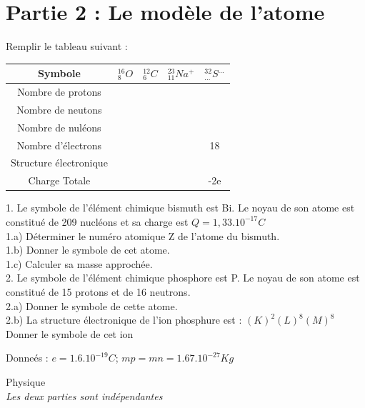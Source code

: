\documentclass[12pt]{article}
\begin{document}
\section*{Partie 2 : Le modèle de l'atome}
Remplir le tableau suivant :

    \begin{center}
    \begin{tabular} { | c | c | c |c|c| }
    \hline\hline
        Symbole         & $^{16}_8O$ &$^{12}_6C$ & $^{23}_{11}Na^{+}$ & $^{32}_{...}S^{...}$\\\hline
        Nombre de protons & & & & \\\hline
        Nombre de neutons & & & & \\\hline
        Nombre de nuléons & & & & \\\hline
        Nombre d’électrons& & & & 18\\\hline
        Structure électronique & & & & \\\hline
        Charge Totale & & & &-2e \\\hline
    \hline
    \end{tabular}
    \end{center}
    1. Le symbole de l’élément chimique bismuth est Bi. Le noyau de son atome est
constitué de 209 nucléons et sa charge est $Q = 1,33.10^{-17}C$
\\1.a) Déterminer le numéro atomique Z de l’atome du bismuth.
\\1.b) Donner le symbole de cet atome.
\\1.c) Calculer sa masse approchée.
\\2. Le symbole de l’élément chimique phosphore est P. Le noyau de
son atome est constitué de 15 protons et de 16 neutrons.
\\2.a) Donner le symbole de cette atome.
\\2.b) La structure électronique de l’ion phosphure est : $(K)^2(L)^8(M)^8$ Donner le symbole de cet ion

Donneés : $e = 1.6.10^{-19} C$;  $mp=mn=1.67.10^{-27}Kg$
\begin{center}
    \vspace{3cm}
\hrulefill
\Large{Physique }
\hrulefill\\
    \emph{Les deux parties sont indépendantes}
\end{center}
\end{document}
